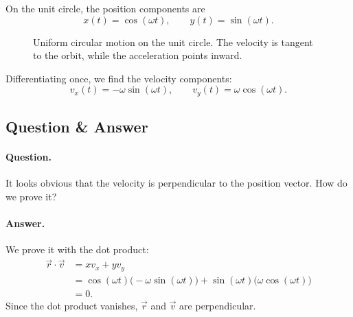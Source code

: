 On the unit circle, the position components are
\begin{equation}
x(t)=\cos(\omega t),\qquad y(t)=\sin(\omega t).
\end{equation}

\begin{figure}
\centering
{}
\caption{Uniform circular motion on the unit circle. The velocity is tangent to the orbit, while the acceleration points inward.}
\end{figure}

Differentiating once, we find the velocity components:
\begin{equation}
v_x(t)=-\omega\sin(\omega t),\qquad v_y(t)=\omega\cos(\omega t).
\end{equation}

\subsection{Question \& Answer}

\paragraph{Question.} It looks obvious that the velocity is perpendicular to the position vector. How do we prove it?

\paragraph{Answer.} We prove it with the dot product:
\begin{align}
\vec r\cdot\vec v
  &= x v_x + y v_y \\
  &= \cos(\omega t)\bigl(-\omega\sin(\omega t)\bigr)
   + \sin(\omega t)\bigl(\omega\cos(\omega t)\bigr) \\
  &= 0.
\end{align}
Since the dot product vanishes, \(\vec r\) and \(\vec v\) are perpendicular.

